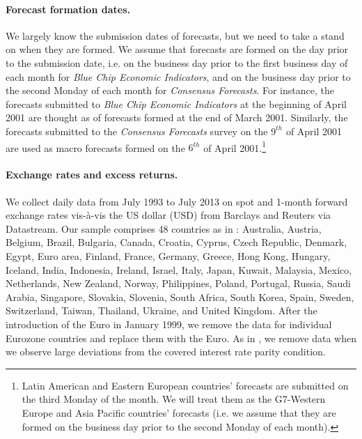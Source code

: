 \paragraph{Forecast formation dates.}
We largely know the submission dates of forecasts, but we need to take a stand on when they are formed. %
We assume that forecasts are formed on the day prior to the submission date, i.e. on the business day prior to the first business day of each month for \emph{Blue Chip Economic Indicators}, and on the business day prior to the second Monday of each month for \emph{Consensus Forecasts}. For instance, the forecasts submitted to \emph{Blue Chip Economic Indicators} at the beginning of April 2001 are thought as of forecasts formed at the end of March 2001.%
Similarly, the forecasts submitted to the \emph{Consensus Forecasts} survey on the $9^{th}$ of April 2001 are used as macro forecasts formed on the $6^{th}$ of April 2001.\footnote{Latin American and Eastern European countries' forecasts are submitted on the third Monday of the month. We will treat them as the G7-Western Europe and Asia Pacific countries' forecasts (i.e. we assume that they are formed on the business day prior to the second Monday of each month).}

\paragraph{Exchange rates and excess returns.}
We collect daily data from July 1993 to July 2013 on spot and 1-month forward exchange rates vis-\`{a}-vis the US dollar (USD) from Barclays and Reuters via Datastream. Our sample comprises 48 countries as in \citet{menkhoff_etal2012}: Australia, Austria, Belgium, Brazil, Bulgaria, Canada, Croatia, Cyprus, Czech Republic, Denmark, Egypt, Euro area, Finland, France, Germany, Greece, Hong Kong, Hungary, Iceland, India, Indonesia, Ireland, Israel, Italy, Japan, Kuwait, Malaysia, Mexico, Netherlands, New Zealand, Norway, Philippines, Poland, Portugal, Russia, Saudi Arabia, Singapore, Slovakia, Slovenia, South Africa, South Korea, Spain, Sweden, Switzerland, Taiwan, Thailand, Ukraine, and United Kingdom. After the introduction of the Euro in January 1999, we remove the data for individual Eurozone countries and replace them with the Euro. As in \citet{lustig_etal2011}, we remove data when we observe large deviations from the covered interest rate parity condition.

